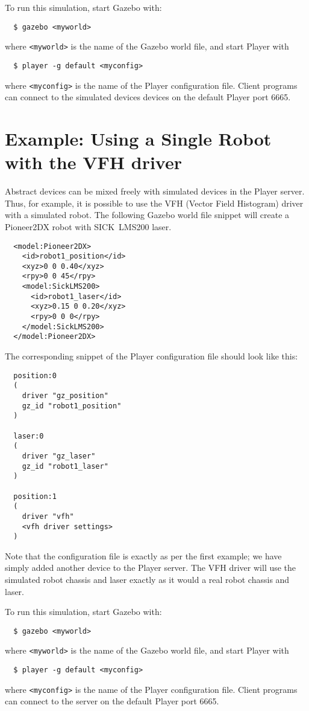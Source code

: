 To run this simulation, start Gazebo with:
\begin{verbatim}
  $ gazebo <myworld>
\end{verbatim} %
where \verb+<myworld>+ is the name of the Gazebo world file,
and start Player with
\begin{verbatim}
  $ player -g default <myconfig>
\end{verbatim} %
where \verb+<myconfig>+ is the name of the Player configuration file.
%
Client programs can connect to the simulated devices devices on the
default Player port 6665.


\section{Example: Using a Single Robot with the VFH driver}

Abstract devices can be mixed freely with simulated devices in the
Player server.  Thus, for example, it is possible to use the VFH
(Vector Field Histogram) driver with a simulated robot.  The following
Gazebo world file snippet will create a Pioneer2DX robot with
SICK~LMS200 laser.
\begin{verbatim}
  <model:Pioneer2DX>
    <id>robot1_position</id>
    <xyz>0 0 0.40</xyz>
    <rpy>0 0 45</rpy>
    <model:SickLMS200>
      <id>robot1_laser</id>
      <xyz>0.15 0 0.20</xyz>
      <rpy>0 0 0</rpy>
    </model:SickLMS200>
  </model:Pioneer2DX>
\end{verbatim}
The corresponding snippet of the Player configuration file should look
like this:
\begin{verbatim}
  position:0
  (
    driver "gz_position"
    gz_id "robot1_position"
  )

  laser:0
  (
    driver "gz_laser"
    gz_id "robot1_laser"
  )

  position:1
  (
    driver "vfh"
    <vfh driver settings>
  )
\end{verbatim}
Note that the configuration file is exactly as per the first example;
we have simply added another device to the Player server.  The VFH
driver will use the simulated robot chassis and laser exactly as it
would a real robot chassis and laser.

To run this simulation, start Gazebo with:
\begin{verbatim}
  $ gazebo <myworld>
\end{verbatim} %
where \verb+<myworld>+ is the name of the Gazebo world file,
and start Player with
\begin{verbatim}
  $ player -g default <myconfig>
\end{verbatim} %
where \verb+<myconfig>+ is the name of the Player configuration file.
%
Client programs can connect to the server on the default Player port
6665.


